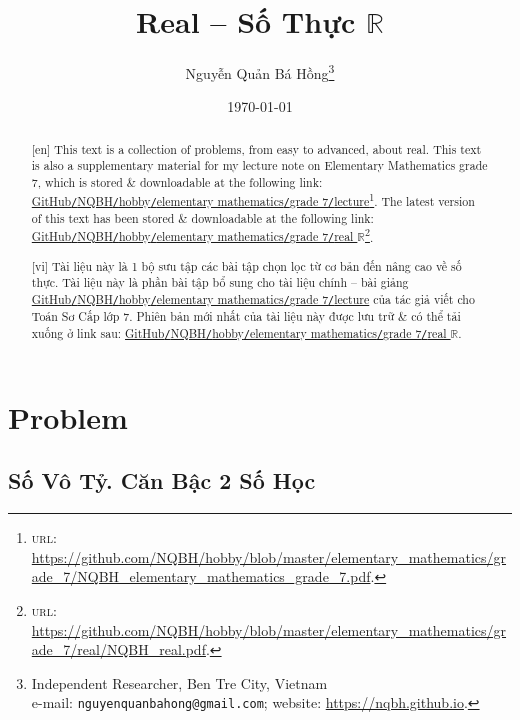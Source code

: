 \documentclass{article}
\title{Real -- Số Thực $\mathbb{R}$}
\author{Nguyễn Quản Bá Hồng\footnote{Independent Researcher, Ben Tre City, Vietnam\\e-mail: \texttt{nguyenquanbahong@gmail.com}; website: \url{https://nqbh.github.io}.}}
\date{\today}
\begin{document}
\maketitle
\begin{abstract}
	\textsf{[en]} This text is a collection of problems, from easy to advanced, about real. This text is also a supplementary material for my lecture note on Elementary Mathematics grade 7, which is stored \& downloadable at the following link: \href{https://github.com/NQBH/hobby/blob/master/elementary_mathematics/grade_7/NQBH_elementary_mathematics_grade_7.pdf}{GitHub\texttt{/}NQBH\texttt{/}hobby\texttt{/}elementary mathematics\texttt{/}grade 7\texttt{/}lecture}\footnote{\textsc{url}: \url{https://github.com/NQBH/hobby/blob/master/elementary_mathematics/grade_7/NQBH_elementary_mathematics_grade_7.pdf}.}. The latest version of this text has been stored \& downloadable at the following link: \href{https://github.com/NQBH/hobby/blob/master/elementary_mathematics/grade_7/real/NQBH_real.pdf}{GitHub\texttt{/}NQBH\texttt{/}hobby\texttt{/}elementary mathematics\texttt{/}grade 7\texttt{/}real $\mathbb{R}$}\footnote{\textsc{url}: \url{https://github.com/NQBH/hobby/blob/master/elementary_mathematics/grade_7/real/NQBH_real.pdf}.}.
	\vspace{2mm}
	
	\textsf{[vi]} Tài liệu này là 1 bộ sưu tập các bài tập chọn lọc từ cơ bản đến nâng cao về số thực. Tài liệu này là phần bài tập bổ sung cho tài liệu chính -- bài giảng \href{https://github.com/NQBH/hobby/blob/master/elementary_mathematics/grade_7/NQBH_elementary_mathematics_grade_7.pdf}{GitHub\texttt{/}NQBH\texttt{/}hobby\texttt{/}elementary mathematics\texttt{/}grade 7\texttt{/}lecture} của tác giả viết cho Toán Sơ Cấp lớp 7. Phiên bản mới nhất của tài liệu này được lưu trữ \& có thể tải xuống ở link sau: \href{https://github.com/NQBH/hobby/blob/master/elementary_mathematics/grade_7/real/NQBH_real.pdf}{GitHub\texttt{/}NQBH\texttt{/}hobby\texttt{/}elementary mathematics\texttt{/}grade 7\texttt{/}real $\mathbb{R}$}.
\end{abstract}
\setcounter{secnumdepth}{4}
\setcounter{tocdepth}{3}
\tableofcontents


\section{Problem}

\subsection{Số Vô Tỷ. Căn Bậc 2 Số Học}
\end{document}
